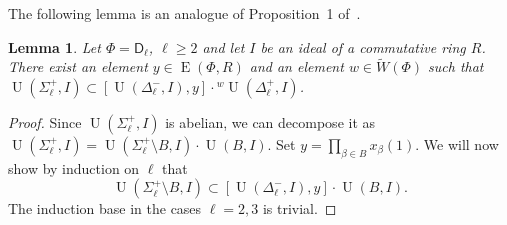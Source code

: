 \documentclass[oneside, 12pt]{amsart}
\theoremstyle{plain}
\numberwithin{equation}{section}
\newtheorem{lemma}{Lemma}
\numberwithin{lemma}{section}
\theoremstyle{definition}
\theoremstyle{remark}
\DeclareMathOperator{\E}{E}
\DeclareMathOperator{\U}{U}
\newcommand{\rD}{\mathsf{D}}
\begin{document}
The following lemma is an analogue of Proposition~1 of~\cite{Nik07}.
\begin{lemma}\label{lemma:nikolov-type-dl}
Let $\Phi=\rD_\ell$, $\ell\geq 2$ and let $I$ be an ideal of a  commutative ring $R$.
There exist an element $y\in\E(\Phi, R)$ and an element $w\in\widetilde{W}(\Phi)$ such that $\U(\Sigma_\ell^+, I)\subset[\U(\Delta_\ell^-, I), y]\cdot{}^w\!\U(\Delta_\ell^+, I)$.
\end{lemma}
\begin{proof}
Since $\U(\Sigma_\ell^+, I)$ is abelian, we can decompose it as $\U(\Sigma_\ell^+, I)=\U(\Sigma_\ell^+\setminus B, I) \cdot \U(B, I)$. 
Set $y=\prod_{\beta\in B}x_\beta(1)$. 
We will now show by induction on $\ell$ that 
\begin{equation}\label{eq:ind-stat} \U(\Sigma_\ell^+\setminus B, I)\subset[\U(\Delta_\ell^-, I), y]\cdot\U(B, I). \end{equation}
The induction base in the cases $\ell=2, 3$ is trivial.


\end{proof}
\end{document}
